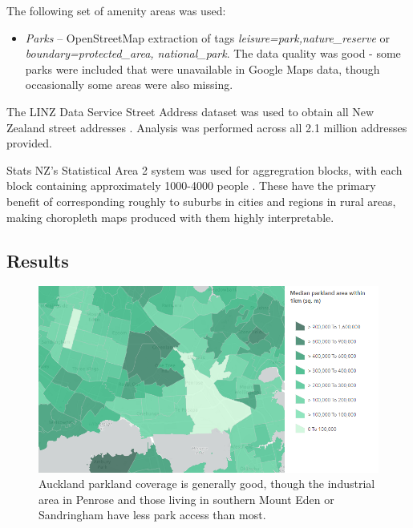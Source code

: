 \documentclass[12pt,a4paper]{article}
\begin{document}
The following set of amenity areas was used:
\begin{itemize}
	\item \emph{Parks} -- OpenStreetMap extraction of tags \emph{leisure=park,nature\_reserve} or \emph{boundary=protected\_area, national\_park}. The data quality was good - some parks were included that were unavailable in Google Maps data, though occasionally some areas were also missing.
\end{itemize}

The LINZ Data Service Street Address dataset was used to obtain all New Zealand street addresses \citep{linz:2019}. Analysis was performed across all 2.1 million addresses provided.

Stats NZ's Statistical Area 2 system was used for aggregration blocks, with each block containing approximately 1000-4000 people \citep{statsnz:2017}. These have the primary benefit of corresponding roughly to suburbs in cities and regions in rural areas, making choropleth maps produced with them highly interpretable.


\subsection{Results}

\begin{figure}[!htbp]
	\begin{center}
		\includegraphics[width=170mm]{./figures/central_auckland_parks.png}
		\caption{\centering Auckland parkland coverage is generally good, though the industrial area in Penrose and those living in southern Mount Eden or Sandringham have less park access than most.}
		\label{fig:akl_parks}
	\end{center}
\end{figure}
\end{document}
